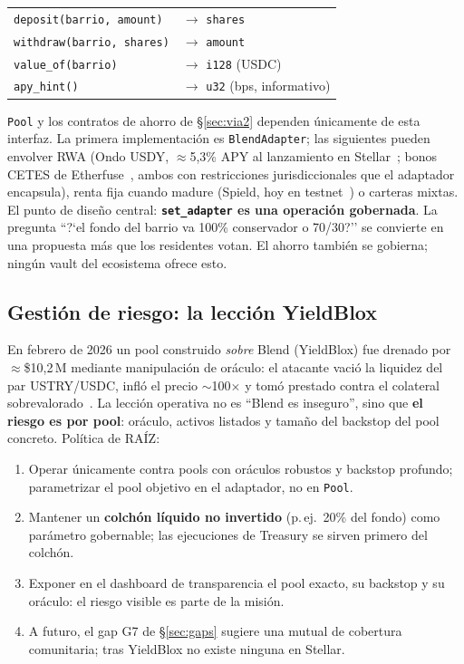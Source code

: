 \documentclass[twocolumn,10pt]{article}
\begin{document}
\begin{center}
\small
\begin{tabular}{@{}ll@{}}
\toprule
\texttt{deposit(barrio, amount)} & $\to$ \texttt{shares} \\
\texttt{withdraw(barrio, shares)} & $\to$ \texttt{amount} \\
\texttt{value\_of(barrio)} & $\to$ \texttt{i128} (USDC) \\
\texttt{apy\_hint()} & $\to$ \texttt{u32} (bps, informativo) \\
\bottomrule
\end{tabular}
\end{center}

\texttt{Pool} y los contratos de ahorro de \S\ref{sec:via2} dependen \'unicamente de esta interfaz. La primera implementaci\'on es \texttt{BlendAdapter}; las siguientes pueden envolver RWA (Ondo USDY, $\approx$5{,}3\% APY al lanzamiento en Stellar~\cite{usdy}; bonos CETES de Etherfuse~\cite{etherfuse}, ambos con restricciones jurisdiccionales que el adaptador encapsula), renta fija cuando madure (Spield, hoy en testnet~\cite{spield}) o carteras mixtas. El punto de dise\~no central: \textbf{\texttt{set\_adapter} es una operaci\'on gobernada}. La pregunta ``?`el fondo del barrio va 100\% conservador o 70/30?'' se convierte en una propuesta m\'as que los residentes votan. El ahorro tambi\'en se gobierna; ning\'un vault del ecosistema ofrece esto.

\subsection{Gesti\'on de riesgo: la lecci\'on YieldBlox}
\label{sec:riesgo}

En febrero de 2026 un pool construido \emph{sobre} Blend (YieldBlox) fue drenado por $\approx$\$10{,}2\,M mediante manipulaci\'on de or\'aculo: el atacante vaci\'o la liquidez del par USTRY/USDC, infl\'o el precio $\sim$100$\times$ y tom\'o prestado contra el colateral sobrevalorado~\cite{yieldblox}. La lecci\'on operativa no es ``Blend es inseguro'', sino que \textbf{el riesgo es por pool}: or\'aculo, activos listados y tama\~no del backstop del pool concreto. Pol\'itica de RA\'IZ:

\begin{enumerate}
\item Operar \'unicamente contra pools con or\'aculos robustos y backstop profundo; parametrizar el pool objetivo en el adaptador, no en \texttt{Pool}.
\item Mantener un \textbf{colch\'on l\'iquido no invertido} (p.\,ej.\ 20\% del fondo) como par\'ametro gobernable; las ejecuciones de Treasury se sirven primero del colch\'on.
\item Exponer en el dashboard de transparencia el pool exacto, su backstop y su or\'aculo: el riesgo visible es parte de la misi\'on.
\item A futuro, el gap G7 de \S\ref{sec:gaps} sugiere una mutual de cobertura comunitaria; tras YieldBlox no existe ninguna en Stellar.
\end{enumerate}
\end{document}

